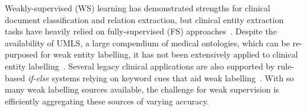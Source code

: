 \documentclass[10.7pt,]{article}
\begin{document}
Weakly-supervised (WS) learning has demonstrated strengths for clinical document classification and relation extraction, but clinical entity extraction tasks have heavily relied on fully-supervised (FS) approaches~\cite{meng2018weakly,wang2019clinical,mintz2009distant,elangovan2020assigning,weber2020pedl,mallory2020extracting}.
Despite the availability of UMLS, a large compendium of medical ontologies, which can be re-purposed for weak entity labelling, it has not been extensively applied to clinical entity labelling~\cite{humphreys1998unified}.
Several legacy clinical applications are also supported by rule-based \textit{if-else} systems relying on keyword cues that aid weak labelling~\cite{friedlin2008software,kim2017extracting,yang2015automatic}.
With so many weak labelling sources available, the challenge for weak supervision is efficiently aggregating these sources of varying accuracy.
\end{document}
